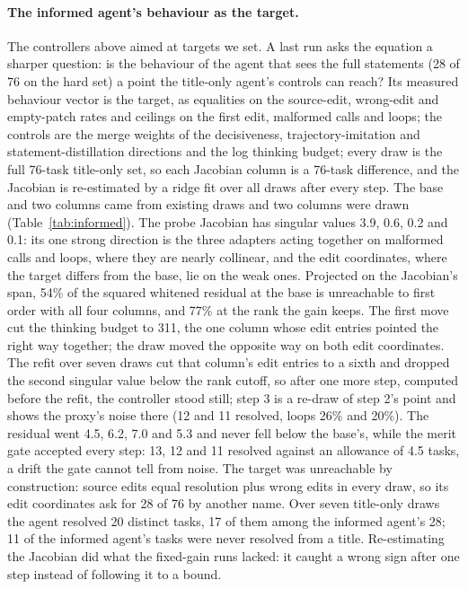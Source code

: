 \documentclass[11pt]{article}
\begin{document}
\paragraph{The informed agent's behaviour as the target.} The controllers above aimed at targets we set. A last run asks the equation a sharper question: is the behaviour of the agent that sees the full statements (28 of 76 on the hard set) a point the title-only agent's controls can reach? Its measured behaviour vector is the target, as equalities on the source-edit, wrong-edit and empty-patch rates and ceilings on the first edit, malformed calls and loops; the controls are the merge weights of the decisiveness, trajectory-imitation and statement-distillation directions and the log thinking budget; every draw is the full 76-task title-only set, so each Jacobian column is a 76-task difference, and the Jacobian is re-estimated by a ridge fit over all draws after every step. The base and two columns came from existing draws and two columns were drawn (Table~\ref{tab:informed}). The probe Jacobian has singular values 3.9, 0.6, 0.2 and 0.1: its one strong direction is the three adapters acting together on malformed calls and loops, where they are nearly collinear, and the edit coordinates, where the target differs from the base, lie on the weak ones. Projected on the Jacobian's span, 54\% of the squared whitened residual at the base is unreachable to first order with all four columns, and 77\% at the rank the gain keeps. The first move cut the thinking budget to 311, the one column whose edit entries pointed the right way together; the draw moved the opposite way on both edit coordinates. The refit over seven draws cut that column's edit entries to a sixth and dropped the second singular value below the rank cutoff, so after one more step, computed before the refit, the controller stood still; step 3 is a re-draw of step 2's point and shows the proxy's noise there (12 and 11 resolved, loops 26\% and 20\%). The residual went 4.5, 6.2, 7.0 and 5.3 and never fell below the base's, while the merit gate accepted every step: 13, 12 and 11 resolved against an allowance of 4.5 tasks, a drift the gate cannot tell from noise. The target was unreachable by construction: source edits equal resolution plus wrong edits in every draw, so its edit coordinates ask for 28 of 76 by another name. Over seven title-only draws the agent resolved 20 distinct tasks, 17 of them among the informed agent's 28; 11 of the informed agent's tasks were never resolved from a title. Re-estimating the Jacobian did what the fixed-gain runs lacked: it caught a wrong sign after one step instead of following it to a bound.
\end{document}
